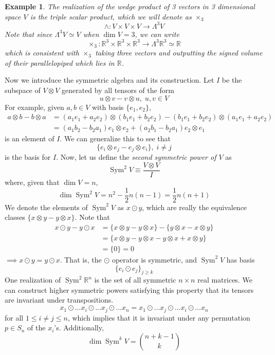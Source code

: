 \documentclass{article}
\DeclareMathOperator{\Sym}{Sym}
\newtheorem{example}{Example}[section]
\theoremstyle{remark}
\theoremstyle{definition}
\begin{document}
    \begin{example}
    The realization of the wedge product of 3 vectors in 3 dimensional space $V$ is the \textit{triple scalar product}, which we will denote as $\times_3$
    \[\wedge: V \times V \times V \longrightarrow \Lambda^3 V\]
    Note that since $\Lambda^3 V \simeq V$ when $\dim{V} = 3$, we can write 
    \[\times_3: \mathbb{R}^3 \times \mathbb{R}^3 \times \mathbb{R}^3 \longrightarrow \Lambda^3 \mathbb{R}^3 \simeq \mathbb{R}\]
    which is consistent with $\times_3$ taking three vectors and outputting the signed volume of their parallelopiped which lies in $\mathbb{R}$. 
    \end{example}

    Now we introduce the symmetric algebra and its construction. Let $I$ be the subspace of $V \otimes V$ generated by all tensors of the form 
    \[u \otimes v - v \otimes u, \; u, v \in V\]
    For example, given $a, b \in V$ with basis $\{e_1, e_2\}$, 
    \begin{align*}
        a \otimes b - b \otimes a & = (a_1 e_1 + a_2 e_2) \otimes (b_1 e_1 + b_2 e_2) - (b_1 e_1 + b_2 e_2) \otimes (a_1 e_1 + a_2 e_2) \\
        & = (a_1 b_2 - b_2 a_1) e_1 \otimes e_2 + (a_2 b_1 - b_2 a_1) e_2 \otimes e_1 
    \end{align*}
    is an element of $I$. We can generalize this to see that
    \[\{e_i \otimes e_j - e_j \otimes e_i\}, \; i \neq j\]
    is the basis for $I$. Now, let us define the \textit{second symmetric power of $V$} as 
    \[\Sym^2 V \equiv \frac{V \otimes V}{I}\]
    where, given that $\dim{V} = n$, 
    \[\dim{\Sym^2 V} = n^2 - \frac{1}{2} n (n-1) = \frac{1}{2} n (n+1)\]
    We denote the elements of $\Sym^2 V$ as $x \odot y$, which are really the equivalence classes $\{x \otimes y - y \otimes x\}$. Note that
    \begin{align*}
        x \odot y - y \odot x & = \{x \otimes y - y \otimes x\} - \{ y \otimes x - x \otimes y\} \\
        & = \{ x \otimes y - y \otimes x - y \otimes x + x \otimes y\} \\
        & = \{0\} = 0
    \end{align*}
    $\implies x \odot y = y \odot x$. That is, the $\odot$ operator is symmetric, and $\Sym^2 V$ has basis 
    \[ \{e_i \odot e_j\}_{j \geq k}\]
    One realization of $\Sym^2 \mathbb{R}^n$ is the set of all symmetric $n \times n$ real matrices. We can construct higher symmetric powers satisfying this property that its tensors are invariant under transpositions. 
    \[x_1 \odot ... x_i \odot ... x_j \odot ... x_n = x_1 \odot ... x_j \odot ... x_i \odot ... x_n\]
    for all $1 \leq i \neq j \leq n$, which implies that it is invariant under any permutation $p \in S_n$ of the $x_i$'s. Additionally, 
    \[\dim{\Sym^k V} = \binom{n+k-1}{k}\]
\end{document}
